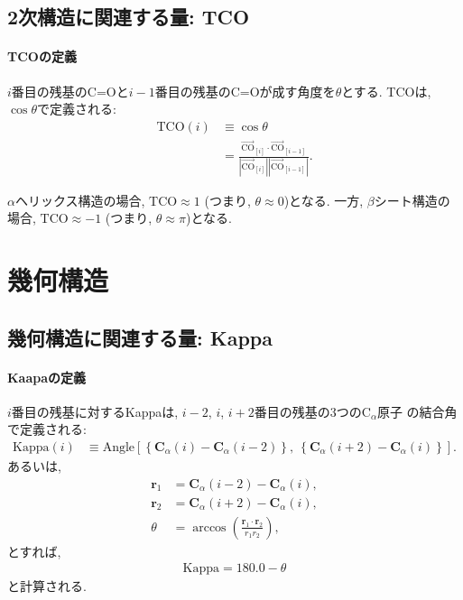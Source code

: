 \subsection{2次構造に関連する量: TCO}
\paragraph{TCOの定義}
$i$番目の残基のC=Oと$i-1$番目の残基のC=Oが成す角度を$\theta$とする. 
TCOは, $\cos \theta$で定義される:
\begin{align}
 \mathrm{TCO} (i)
&\equiv 
 \cos \theta \\
&=
 \frac{ \overrightarrow{\mathrm{CO}}_{[i]} \cdot \overrightarrow{\mathrm{CO}}_{[i-1]}}
      {|\overrightarrow{\mathrm{CO}}_{[i]}|     |\overrightarrow{\mathrm{CO}}_{[i-1]}|}.
\end{align}

$\alpha$ヘリックス構造の場合, $\mathrm{TCO} \approx 1$ (つまり, $\theta \approx 0$)となる.
一方, $\beta$シート構造の場合, $\mathrm{TCO} \approx -1$ (つまり, $\theta \approx \pi$)となる.


\section{幾何構造}
\subsection{幾何構造に関連する量: Kappa}
\paragraph{Kaapaの定義}
$i$番目の残基に対するKappaは, $i-2$, $i$, $i+2$番目の残基の3つの$\mathrm{C}_{\alpha}$原子
の結合角で定義される:
\begin{align}
 \mathrm{Kappa}(i)
&\equiv
 \mathrm{Angle}
 \left[
        \left\{ \mathbf{C}_{\alpha}(i)   - \mathbf{C}_{\alpha}(i-2) \right\},~
        \left\{ \mathbf{C}_{\alpha}(i+2) - \mathbf{C}_{\alpha}(i)   \right\}
 \right].
\end{align}
あるいは, 
\begin{align}
 \bm{r}_{1} &= \mathbf{C}_{\alpha}(i-2) - \mathbf{C}_{\alpha}(i),　\\
 \bm{r}_{2} &= \mathbf{C}_{\alpha}(i+2) - \mathbf{C}_{\alpha}(i),  \\
 \theta     &= \arccos
                  \left(
                         \frac{\bm{r}_{1} \cdot \bm{r}_{2}}{r_{1} r_{2}}
                  \right),
\end{align}
とすれば,
\begin{align}
 \mathrm{Kappa} = 180.0 - \theta
\end{align}
と計算される.

